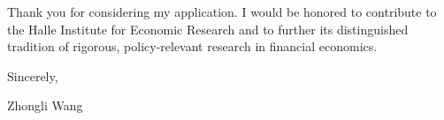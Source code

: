 \documentclass{nfr}
\begin{document}
Thank you for considering my application. 
I would be honored to contribute to the Halle Institute for Economic Research and to further its distinguished tradition of rigorous, policy-relevant research in financial economics.\\
\vspace{5mm}

\noindent Sincerely,\\
\vspace{5mm}

\noindent Zhongli Wang

\vspace{10mm}




\end{document}
